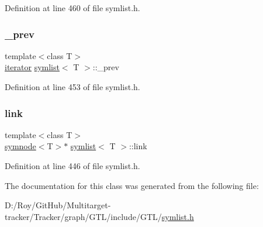 Definition at line 460 of file symlist.\+h.

\mbox{\label{classsymlist_ac5e2276db5018abebf297079a324ed9e}} 
\subsubsection{\texorpdfstring{\+\_\+prev}{\_prev}}
{\footnotesize\ttfamily template$<$class T$>$ \\
\mbox{\hyperlink{classsymlist_a66045fbe3d98975e5537092ede8b50df}{iterator}} \mbox{\hyperlink{classsymlist}{symlist}}$<$ T $>$\+::\+\_\+prev\hspace{0.3cm}{\ttfamily [private]}}



Definition at line 453 of file symlist.\+h.

\mbox{\label{classsymlist_a8fa81a7f6d0bb986bb593776db582c90}} 
\subsubsection{\texorpdfstring{link}{link}}
{\footnotesize\ttfamily template$<$class T$>$ \\
\mbox{\hyperlink{structsymnode}{symnode}}$<$T$>$$\ast$ \mbox{\hyperlink{classsymlist}{symlist}}$<$ T $>$\+::link\hspace{0.3cm}{\ttfamily [private]}}



Definition at line 446 of file symlist.\+h.



The documentation for this class was generated from the following file\+:\begin{DoxyCompactItemize}
\item 
D\+:/\+Roy/\+Git\+Hub/\+Multitarget-\/tracker/\+Tracker/graph/\+G\+T\+L/include/\+G\+T\+L/\mbox{\hyperlink{symlist_8h}{symlist.\+h}}\end{DoxyCompactItemize}
